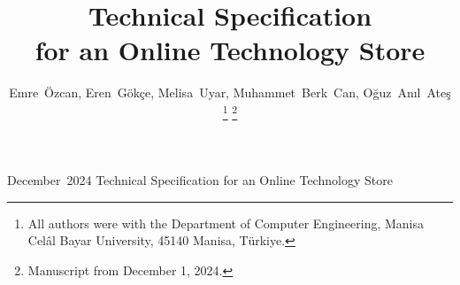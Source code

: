 \documentclass[a4paper,journal]{IEEEtran}
\begin{document}
%
\title{Technical Specification\\for an Online Technology Store}
%
%
%

\author{
Emre~Özcan,
Eren~Gökçe,
Melisa~Uyar,
Muhammet~Berk~Can,
Oğuz~Anıl~Ateş%
\thanks{All authors were with the Department of Computer Engineering,
Manisa Celâl Bayar University, 45140 Manisa, Türkiye.}%
\thanks{Manuscript from December 1, 2024.}%
}

%
%



\markboth%
{December~2024}%
{Technical Specification for an Online Technology Store}
%
\end{document}
